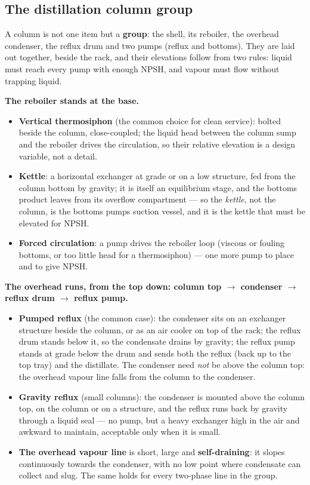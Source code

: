 \documentclass[11pt,a4paper]{article}
\providecommand{\tightlist}{\setlength{\itemsep}{0pt}\setlength{\parskip}{0pt}}
\begin{document}
\hypertarget{the-distillation-column-group}{%
\subsection{The distillation column
group}\label{the-distillation-column-group}}

A column is not one item but a \textbf{group}: the shell, its reboiler,
the overhead condenser, the reflux drum and two pumps (reflux and
bottoms). They are laid out together, beside the rack, and their
elevations follow from two rules: liquid must reach every pump with
enough NPSH, and vapour must flow without trapping liquid.

\textbf{The reboiler stands at the base.}

\begin{itemize}
\tightlist
\item
  \textbf{Vertical thermosiphon} (the common choice for clean service):
  bolted beside the column, close-coupled; the liquid head between the
  column sump and the reboiler drives the circulation, so their relative
  elevation is a design variable, not a detail.
\item
  \textbf{Kettle}: a horizontal exchanger at grade or on a low structure,
  fed from the column bottom by gravity; it is itself an equilibrium
  stage, and the bottoms product leaves from its overflow compartment ---
  so the \emph{kettle}, not the column, is the bottoms
  pump\textquotesingle s suction vessel, and it is the kettle that must
  be elevated for NPSH.
\item
  \textbf{Forced circulation}: a pump drives the reboiler loop (viscous
  or fouling bottoms, or too little head for a thermosiphon) --- one more
  pump to place and to give NPSH.
\end{itemize}

\textbf{The overhead runs, from the top down: column top
\(\rightarrow\) condenser \(\rightarrow\) reflux drum \(\rightarrow\)
reflux pump.}

\begin{itemize}
\tightlist
\item
  \textbf{Pumped reflux} (the common case): the condenser sits on an
  exchanger structure beside the column, or as an air cooler on top of
  the rack; the reflux drum stands below it, so the condensate drains by
  gravity; the reflux pump stands at grade below the drum and sends both
  the reflux (back up to the top tray) and the distillate. The condenser
  need \emph{not} be above the column top: the overhead vapour line falls
  from the column to the condenser.
\item
  \textbf{Gravity reflux} (small columns): the condenser is mounted above
  the column top, on the column or on a structure, and the reflux runs
  back by gravity through a liquid seal --- no pump, but a heavy
  exchanger high in the air and awkward to maintain, acceptable only when
  it is small.
\item
  \textbf{The overhead vapour line} is short, large and
  \textbf{self-draining}: it slopes continuously towards the condenser,
  with no low point where condensate can collect and slug. The same holds
  for every two-phase line in the group.
\end{itemize}
\end{document}
